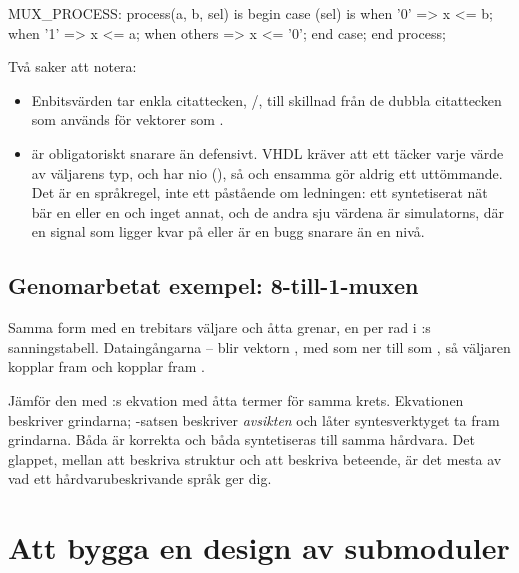 \begin{vhdlcode}
MUX_PROCESS: process(a, b, sel) is
begin
    case (sel) is
        when '0'    => x <= b;
        when '1'    => x <= a;
        when others => x <= '0';
    end case;
end process;
\end{vhdlcode}

Två saker att notera:
\begin{itemize}
  \item Enbitsvärden tar enkla citattecken, /, till skillnad från de dubbla
    citattecken som används för vektorer som .
  \item {} är obligatoriskt snarare än defensivt. VHDL kräver att ett 
    täcker varje värde av väljarens typ, och  har nio (), så
     och  ensamma gör aldrig ett  uttömmande. Det är en språkregel,
    inte ett påstående om ledningen: ett syntetiserat nät bär en  eller en  och
    inget annat, och de andra sju värdena är simulatorns, där en signal som ligger kvar på
     eller  är en bugg snarare än en nivå.
\end{itemize}

\subsection*{Genomarbetat exempel: 8-till-1-muxen}
Samma form med en trebitars väljare och åtta grenar, en per rad i :s
sanningstabell. Dataingångarna -- blir vektorn , med
 som  ner till  som , så väljaren 
kopplar fram  och  kopplar fram .


Jämför den med :s ekvation med åtta termer för samma krets. Ekvationen
beskriver grindarna; -satsen beskriver \emph{avsikten} och låter syntesverktyget ta
fram grindarna. Båda är korrekta och båda syntetiseras till samma hårdvara. Det glappet, mellan
att beskriva struktur och att beskriva beteende, är det mesta av vad ett hårdvarubeskrivande språk
ger dig.

\section{Att bygga en design av submoduler}
\label{c2:sec:submodules}

